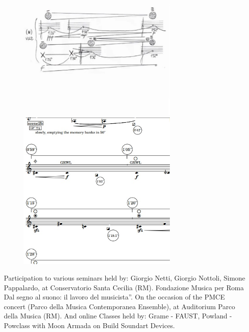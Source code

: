 \documentclass[12pt,landscape]{article}
\begin{document}
{\begin{center}
\begin{figure}[!htb]
\endminipage\hfill
{}%
  \includegraphics[width=8cm]{threestudies1.jpg}

\endminipage\hfill
{}%
  \includegraphics[width=8cm]{deusex1.jpg}

\endminipage
\end{figure}

Participation to various seminars 
held by: 
\newline
Giorgio Netti, Giorgio Nottoli,
Simone Pappalardo, at Conservatorio Santa Cecilia (RM).
\newline
Fondazione Musica per Roma
Dal segno al suono: il lavoro del musicista”. On the occasion of the PMCE concert (Parco della
Musica Contemporanea Ensemble), at Auditorium Parco della Musica (RM).
\newline
And online Classes held by: Grame - FAUST, 
Powland - Powclass with Moon Armada on Build Soundart Devices.

\clearpage



\end{center}}
\end{document}
